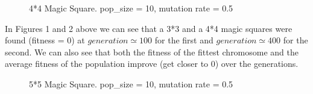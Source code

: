 \documentclass[12pt]{article}
\begin{document}
			\begin{figure}[H]
				\hfill
				\hfill
				\hfill
				\caption{4*4 Magic Square. pop\_size = 10, mutation rate = 0.5}
			\end{figure}
		
			In Figures 1 and 2 above we can see that a 3*3 and a 4*4 magic squares were found (fitness = 0) at $generation\simeq100 $ for the first and $generation\simeq 400$ for the second. We can also see that both the fitness of the fittest chromosome and the average fitness of the population improve (get closer to 0) over the generations.
			\begin{figure}[H]
				\hfill
				\hfill
				\hfill
				\caption{5*5 Magic Square. pop\_size = 10, mutation rate = 0.5}
			\end{figure}
			
\end{document}
